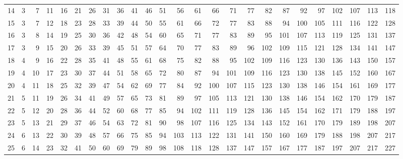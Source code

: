 \begin{center}
{\begin{tabular}{c*{24}{r}}
			14 & 3 & 7 & 11 & 16 & 21 & 26 & 31 & 36 & 41 & 46 & 51 & 56 & 61 & 66 & 71 & 77 & 82 & 87 & 92 & 97 & 102 & 107 & 113 & 118 \\
			15 & 3 & 7 & 12 & 18 & 23 & 28 & 33 & 39 & 44 & 50 & 55 & 61 & 66 & 72 & 77 & 83 & 88 & 94 & 100 & 105 & 111 & 116 & 122 & 128 \\
			16 & 3 & 8 & 14 & 19 & 25 & 30 & 36 & 42 & 48 & 54 & 60 & 65 & 71 & 77 & 83 & 89 & 95 & 101 & 107 & 113 & 119 & 125 & 131 & 137 \\
			17 & 3 & 9 & 15 & 20 & 26 & 33 & 39 & 45 & 51 & 57 & 64 & 70 & 77 & 83 & 89 & 96 & 102 & 109 & 115 & 121 & 128 & 134 & 141 & 147 \\
			18 & 4 & 9 & 16 & 22 & 28 & 35 & 41 & 48 & 55 & 61 & 68 & 75 & 82 & 88 & 95 & 102 & 109 & 116 & 123 & 130 & 136 & 143 & 150 & 157 \\
			19 & 4 & 10 & 17 & 23 & 30 & 37 & 44 & 51 & 58 & 65 & 72 & 80 & 87 & 94 & 101 & 109 & 116 & 123 & 130 & 138 & 145 & 152 & 160 & 167 \\
			20 & 4 & 11 & 18 & 25 & 32 & 39 & 47 & 54 & 62 & 69 & 77 & 84 & 92 & 100 & 107 & 115 & 123 & 130 & 138 & 146 & 154 & 161 & 169 & 177 \\[5pt]
			21 & 5 & 11 & 19 & 26 & 34 & 41 & 49 & 57 & 65 & 73 & 81 & 89 & 97 & 105 & 113 & 121 & 130 & 138 & 146 & 154 & 162 & 170 & 179 & 187 \\
			22 & 5 & 12 & 20 & 28 & 36 & 44 & 52 & 60 & 68 & 77 & 85 & 94 & 102 & 111 & 119 & 128 & 136 & 145 & 154 & 162 & 171 & 179 & 188 & 197 \\
			23 & 5 & 13 & 21 & 29 & 37 & 46 & 54 & 63 & 72 & 81 & 90 & 98 & 107 & 116 & 125 & 134 & 143 & 152 & 161 & 170 & 179 & 189 & 198 & 207 \\
			24 & 6 & 13 & 22 & 30 & 39 & 48 & 57 & 66 & 75 & 85 & 94 & 103 & 113 & 122 & 131 & 141 & 150 & 160 & 169 & 179 & 188 & 198 & 207 & 217 \\
			25 & 6 & 14 & 23 & 32 & 41 & 50 & 60 & 69 & 79 & 89 & 98 & 108 & 118 & 128 & 137 & 147 & 157 & 167 & 177 & 187 & 197 & 207 & 217 & 227 \\
			\midrule
		\end{tabular}%
	}
\end{center}

\newpage
